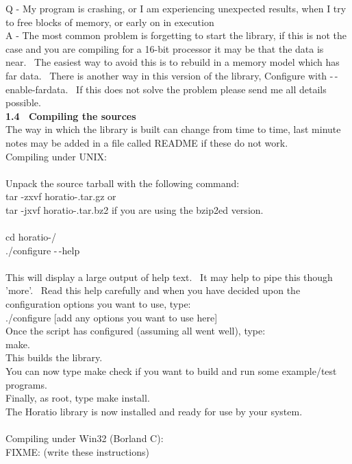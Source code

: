 \documentclass{article}
\begin{document}
\par Q - My program is crashing, or I am experiencing unexpected results, when I try to free blocks of
memory, or early on in execution
\\
A - The most common problem is forgetting to start the library, if
this is not the case and you are compiling for a 16-bit processor it
may
be that the data is near.~ The easiest way to avoid this is to
rebuild
in a memory model which has far data.~ There is another way in
this
version of the library, Configure with -$\,$-enable-fardata.~ If this
does not solve
the problem please send me all details possible.
\\
\textbf{1.4~ Compiling the sources}
\\
The way in which the library is
built can change from time to time,
last minute notes may be added in a file called README if these do not
work.\\
Compiling under UNIX:\\
\\
Unpack the source tarball with the
following command:\\
tar -zxvf horatio-.tar.gz or\\
tar -jxvf horatio-.tar.bz2
if you are using the bzip2ed version.\\
\\
cd horatio-/\\
./configure -$\,$-help\\
\\
This will display a large output
of help text.~ It may help to
pipe this though 'more'.~ Read this help carefully and when you
have decided upon the configuration options you want to use, type:\\
./configure [add any options you
want to use here]\\
Once the script has configured
(assuming all went well), type:\\
make.\\
This builds the library.\\
You can now type make check if you
want to build and run some
example/test programs.\\
Finally, as root, type make
install.\\
The Horatio library is now
installed and ready for use by your system.\\
\\
Compiling under Win32 (Borland C):\\
FIXME: (write these instructions)\\
\end{document}
